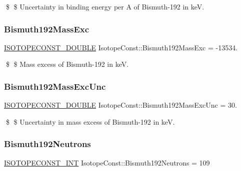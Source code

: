 \$ \$ Uncertainty in binding energy per A of Bismuth-\/192 in keV. \mbox{\label{group___isotope_const-_bismuth-_bi192_ga95faa38d53a3c7d27e592b1128a74e06}} 
\subsubsection{\texorpdfstring{Bismuth192\+Mass\+Exc}{Bismuth192MassExc}}
{\footnotesize\ttfamily \mbox{\hyperlink{group___isotope_const-_macros_ga8f45a7272ce02c0b4c65c44636ed719a}{I\+S\+O\+T\+O\+P\+E\+C\+O\+N\+S\+T\+\_\+\+D\+O\+U\+B\+LE}} Isotope\+Const\+::\+Bismuth192\+Mass\+Exc = -\/13534.}

\$ \$ Mass excess of Bismuth-\/192 in keV. \mbox{\label{group___isotope_const-_bismuth-_bi192_ga56ada8fce06e22402a8c2902fcb6796a}} 
\subsubsection{\texorpdfstring{Bismuth192\+Mass\+Exc\+Unc}{Bismuth192MassExcUnc}}
{\footnotesize\ttfamily \mbox{\hyperlink{group___isotope_const-_macros_ga8f45a7272ce02c0b4c65c44636ed719a}{I\+S\+O\+T\+O\+P\+E\+C\+O\+N\+S\+T\+\_\+\+D\+O\+U\+B\+LE}} Isotope\+Const\+::\+Bismuth192\+Mass\+Exc\+Unc = 30.}

\$ \$ Uncertainty in mass excess of Bismuth-\/192 in keV. \mbox{\label{group___isotope_const-_bismuth-_bi192_gaf7d7ef908adb7b7f2f03a9b818cdbb5b}} 
\subsubsection{\texorpdfstring{Bismuth192\+Neutrons}{Bismuth192Neutrons}}
{\footnotesize\ttfamily \mbox{\hyperlink{group___isotope_const-_macros_ga5f18360b3e99483a35c32d789e62621c}{I\+S\+O\+T\+O\+P\+E\+C\+O\+N\+S\+T\+\_\+\+I\+NT}} Isotope\+Const\+::\+Bismuth192\+Neutrons = 109}

